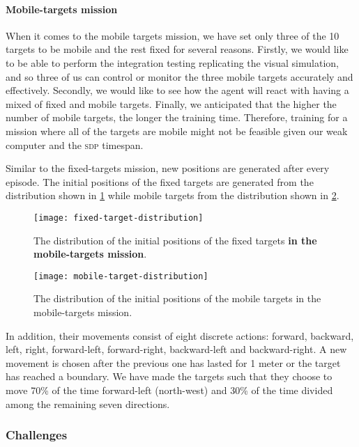 \documentclass[../main.tex]{subfiles}
\begin{document}
\paragraph{Mobile-targets mission}

When it comes to the mobile targets mission, we have set only three of
the 10 targets to be mobile and the rest fixed for several reasons.
Firstly, we would like to be able to perform the integration testing
replicating the visual simulation, and so three of us can control or
monitor the three mobile targets accurately and effectively.
Secondly, we would like to see how the agent will react with having a
mixed of fixed and mobile targets.
Finally, we anticipated that the higher the number of mobile targets, the 
longer the training time. 
Therefore, training for a mission where all of the targets are mobile
might not be feasible given our weak computer and the \textsc{sdp}
timespan.

Similar to the fixed-targets mission,
new positions are generated after every episode.
The initial positions of the fixed targets are generated from 
the distribution shown in
\cref{fig:fixed-position-distribution}
while mobile targets from the distribution shown in
\cref{fig:mobile-position-distribution}.

\begin{figure}[!t]
	\centering
        \texttt{[image: fixed-target-distribution]}
	\caption{The distribution of the initial positions of the
        fixed targets \textbf{in the mobile-targets mission}.}
	\label{fig:fixed-position-distribution}
\end{figure}

\begin{figure}[!t]
	\centering
	\texttt{[image: mobile-target-distribution]}
	\caption{The distribution of the initial positions of the
            mobile targets in the mobile-targets mission.}
	\label{fig:mobile-position-distribution}
\end{figure}

In addition, their movements consist of eight discrete
actions: forward, backward, left, right,
forward-left, forward-right, backward-left and backward-right.
A new movement is chosen after the previous one has lasted for 1 meter
or the target has reached a boundary.
We have made the targets such that they choose to move 70\% 
of the time forward-left (north-west) and 30\% of the time divided
among the remaining seven directions.

\subsubsection{Challenges}
\end{document}
